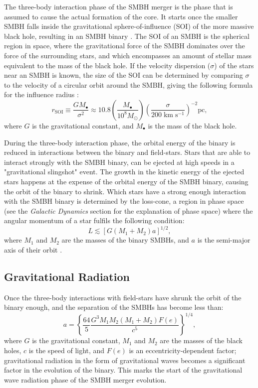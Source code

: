\documentclass[english, twoside]{HYgradu}
\begin{document}
The three-body interaction phase of the SMBH merger is the phase that is assumed to cause the actual formation of the core. It starts once the smaller SMBH falls inside the gravitational sphere-of-influence (SOI) of the more massive black hole, resulting in an SMBH binary \citep{MerrittBook}. The SOI of an SMBH is the spherical region in space, where the gravitational force of the SMBH dominates over the force of the surrounding stars, and which encompasses an amount of stellar mass equivalent to the mass of the black hole. If the velocity dispersion ($\sigma$) of the stars near an SMBH is known, the size of the SOI can be determined by comparing $\sigma$ to the velocity of a circular orbit around the SMBH, giving the following formula for the influence radius \citep{MerrittBook}:
\begin{equation}
r_\mathrm{SOI} \equiv \frac{GM_\bullet}{\sigma^2} \approx 10.8 \left( \frac{M_\bullet}{10^8 M_\odot} \right) \left( \frac{\sigma}{200 \; \mathrm{km \; s^{-1}}} \right)^{-2} \mathrm{pc},
\end{equation}
where $G$ is the gravitational constant, and $M_\bullet$ is the mass of the black hole. 

During the three-body interaction phase, the orbital energy of the binary is reduced in interactions between the binary and field-stars. Stars that are able to interact strongly with the SMBH binary, can be ejected at high speeds in a "gravitational slingshot" event. The growth in the kinetic energy of the ejected stars happens at the expense of the orbital energy of the SMBH binary, causing the orbit of the binary to shrink. Which stars have a strong enough interaction with the SMBH binary is determined by the loss-cone, a region in phase space (see the \textit{Galactic Dynamics} section for the explanation of phase space) where the angular momentum of a star fulfils the following condition:
\begin{equation}
L \lesssim \left[ G(M_1 + M_2) a \right]^{1/2}, \label{eq:loss-cone}
\end{equation}
where $M_1$ and $M_2$ are the masses of the binary SMBHs, and $a$ is the semi-major axis of their orbit \citep{BinneyTremaine}. 

\subsection{Gravitational Radiation} \label{section:gravitational_radiation}

Once the three-body interactions with field-stars have shrunk the orbit of the binary enough, and the separation of the SMBHs has become less than:
\begin{equation}
a = \left\lbrace \frac{64}{5} \frac{G^3M_1M_2(M_1+M_2)F(e)}{c^5} \right\rbrace^{1/4},
\end{equation}
where $G$ is the gravitational constant, $M_1$ and $M_2$ are the masses of the black holes, $c$ is the speed of light, and $F(e)$ is an eccentricity-dependent factor; gravitational radiation in the form of gravitational waves becomes a significant factor in the evolution of the binary. This marks the start of the gravitational wave radiation phase of the SMBH merger evolution. 
\end{document}
